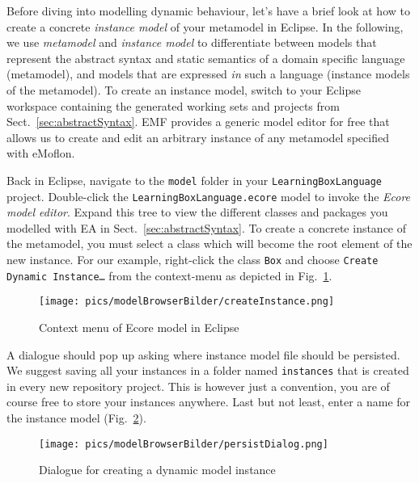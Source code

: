 \visHeader

Before diving into modelling dynamic behaviour, let's have a brief look at how to create a concrete \emph{instance model} of your metamodel in Eclipse.
In the following, we use \emph{metamodel} and \emph{instance model} to differentiate between models that represent the abstract syntax and static semantics of a domain specific language (metamodel), and models that are expressed \emph{in} such a language (instance models of the metamodel).
To create an instance model, switch to your Eclipse workspace containing the generated working sets and projects from Sect.~\ref{sec:abstractSyntax}.
EMF provides a generic model editor for free that allows us to create and edit an arbitrary instance of any metamodel specified with eMoflon.

Back in Eclipse, navigate to the \texttt{model} folder in your \texttt{LearningBoxLanguage} project.
Double-click the \texttt{LearningBoxLanguage.ecore} model to invoke  the \emph{Ecore model editor}.
Expand this tree to view the different classes and packages you modelled with EA in Sect.~\ref{sec:abstractSyntax}.
To create a concrete instance of the metamodel, you must select a class which will become the root element of the new instance.
For our example, right-click the class \texttt{Box} and choose \texttt{Create Dynamic Instance\ldots} from the context-menu as depicted in Fig.~\ref{fig:context_menu}.

\begin{figure}[htbp]
	\centering
  \texttt{[image: pics/modelBrowserBilder/createInstance.png]}
	\caption{Context menu of Ecore model in Eclipse}
	\label{fig:context_menu}
\end{figure}

A dialogue should pop up asking where instance model file should be persisted.
We suggest saving all your instances in a folder named \texttt{instances} that is created in every new repository project.
This is however just a convention, you are of course free to store your instances anywhere.
Last but not least, enter a name for the instance model (Fig.~\ref{fig:store_dynamic_instance}).

\begin{figure}[htbp]
	\centering
  \texttt{[image: pics/modelBrowserBilder/persistDialog.png]}
	\caption{Dialogue for creating a dynamic model instance}
	\label{fig:store_dynamic_instance}
\end{figure}

